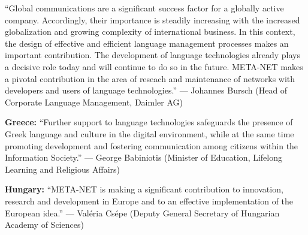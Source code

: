 \documentclass[10pt, plain]{../../metanetpaper}
\begin{document}





\medskip ``Global communications are a significant success factor for a globally active company. Accordingly, their importance is steadily increasing with the increased globalization and growing complexity of international business. In this context, the design of effective and efficient language management processes makes an important contribution. The development of language technologies already plays a decisive role today and will continue to do so in the future. META-NET makes a pivotal contribution in the area of reseach and maintenance of networks with developers and users of language technologies.'' ---
Johannes Bursch (Head of Corporate Language Management, Daimler AG)

\medskip \textbf{Greece:} ``Further support to language technologies safeguards the presence of Greek language and culture in the digital environment, while at the same time promoting development and fostering communication among citizens within the Information Society.'' --- George Babiniotis (Minister of Education, Lifelong Learning and Religious Affairs)

\medskip \textbf{Hungary:} ``META-NET is making a significant contribution to innovation, research and development in Europe and to an effective implementation of the European idea.'' --- Valéria Csépe (Deputy General Secretary of Hungarian Academy of Sciences)
\end{document}
